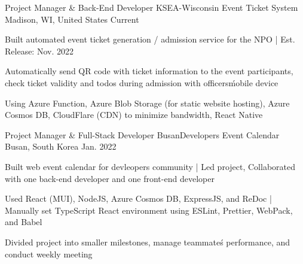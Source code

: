 

\begin{cventries}

  \cventry
  {Project Manager \& Back-End Developer} %
  {KSEA-Wisconsin Event Ticket System} %
  {Madison, WI, United States} %
  {Current} %
  {
    \begin{cvitems} %
      \item {Built automated event ticket generation / admission service for the NPO | Est. Release: Nov. 2022}
      \item {Automatically send QR code with ticket information to the event participants, check ticket validity and todos during admission with officers\' mobile device}
      \item {Using Azure Function, Azure Blob Storage (for static website hosting), Azure Cosmos DB, CloudFlare (CDN) to minimize bandwidth, React Native}
    \end{cvitems}
  }
  
  \cventry
  {Project Manager \& Full-Stack Developer} %
  {BusanDevelopers Event Calendar} %
  {Busan, South Korea} %
  {Jan. 2022} %
  {
    \begin{cvitems} %
      \item {Built web event calendar for devleopers community | Led project, Collaborated with one back-end developer and one front-end developer}
      \item {Used React (MUI), NodeJS, Azure Cosmos DB, ExpressJS, and ReDoc | Manually set TypeScript React environment using ESLint, Prettier, WebPack, and Babel}
      \item {Divided project into smaller milestones, manage teammate\'s performance, and conduct weekly meeting}
    \end{cvitems}
  }
  

\end{cventries}
